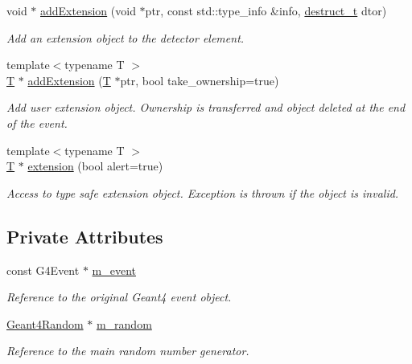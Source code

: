 \begin{DoxyCompactItemize}
void $\ast$ \hyperlink{class_d_d4hep_1_1_simulation_1_1_geant4_event_aee3baf75d103ea5fbb2e59230392c5d1}{addExtension} (void $\ast$ptr, const std::type\_\-info \&info, \hyperlink{class_d_d4hep_1_1_object_extensions_af9ca2813f0d7fa65ac13d905d9721cdf}{destruct\_\-t} dtor)
\begin{DoxyCompactList}\small\item\em Add an extension object to the detector element. \item\end{DoxyCompactList}\item 
{\footnotesize template$<$typename T $>$ }\\\hyperlink{class_t}{T} $\ast$ \hyperlink{class_d_d4hep_1_1_simulation_1_1_geant4_event_af662da07fc86ccd6bc94fdb7b05faa26}{addExtension} (\hyperlink{class_t}{T} $\ast$ptr, bool take\_\-ownership=true)
\begin{DoxyCompactList}\small\item\em Add user extension object. Ownership is transferred and object deleted at the end of the event. \item\end{DoxyCompactList}\item 
{\footnotesize template$<$typename T $>$ }\\\hyperlink{class_t}{T} $\ast$ \hyperlink{class_d_d4hep_1_1_simulation_1_1_geant4_event_afb5a4367c7a4ef75dc716eceef3f2b87}{extension} (bool alert=true)
\begin{DoxyCompactList}\small\item\em Access to type safe extension object. Exception is thrown if the object is invalid. \item\end{DoxyCompactList}\end{DoxyCompactItemize}
\subsection*{Private Attributes}
\begin{DoxyCompactItemize}
\item 
const G4Event $\ast$ \hyperlink{class_d_d4hep_1_1_simulation_1_1_geant4_event_a1d336fefbd6316dc5373a3b2d362cffa}{m\_\-event}
\begin{DoxyCompactList}\small\item\em Reference to the original Geant4 event object. \item\end{DoxyCompactList}\item 
\hyperlink{class_d_d4hep_1_1_simulation_1_1_geant4_random}{Geant4Random} $\ast$ \hyperlink{class_d_d4hep_1_1_simulation_1_1_geant4_event_a0eb7e282d0f186db2a738cc3ac9e1718}{m\_\-random}
\begin{DoxyCompactList}\small\item\em Reference to the main random number generator. \item\end{DoxyCompactList}\end{DoxyCompactItemize}



